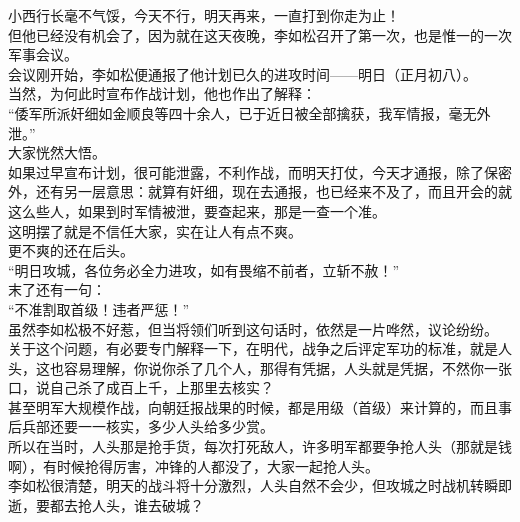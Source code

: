 \begin{multicols}{\theparacolNo}
小西行长毫不气馁，今天不行，明天再来，一直打到你走为止！\\

但他已经没有机会了，因为就在这天夜晚，李如松召开了第一次，也是惟一的一次军事会议。\\

会议刚开始，李如松便通报了他计划已久的进攻时间——明日（正月初八）。\\

当然，为何此时宣布作战计划，他也作出了解释：\\

“倭军所派奸细如金顺良等四十余人，已于近日被全部擒获，我军情报，毫无外泄。”\\

大家恍然大悟。\\

如果过早宣布计划，很可能泄露，不利作战，而明天打仗，今天才通报，除了保密外，还有另一层意思：就算有奸细，现在去通报，也已经来不及了，而且开会的就这么些人，如果到时军情被泄，要查起来，那是一查一个准。\\

这明摆了就是不信任大家，实在让人有点不爽。\\

更不爽的还在后头。\\

“明日攻城，各位务必全力进攻，如有畏缩不前者，立斩不赦！”\\

末了还有一句：\\

“不准割取首级！违者严惩！”\\

虽然李如松极不好惹，但当将领们听到这句话时，依然是一片哗然，议论纷纷。\\

关于这个问题，有必要专门解释一下，在明代，战争之后评定军功的标准，就是人头，这也容易理解，你说你杀了几个人，那得有凭据，人头就是凭据，不然你一张口，说自己杀了成百上千，上那里去核实？\\

甚至明军大规模作战，向朝廷报战果的时候，都是用级（首级）来计算的，而且事后兵部还要一一核实，多少人头给多少赏。\\

所以在当时，人头那是抢手货，每次打死敌人，许多明军都要争抢人头（那就是钱啊），有时候抢得厉害，冲锋的人都没了，大家一起抢人头。\\

李如松很清楚，明天的战斗将十分激烈，人头自然不会少，但攻城之时战机转瞬即逝，要都去抢人头，谁去破城？\\


\end{multicols}
